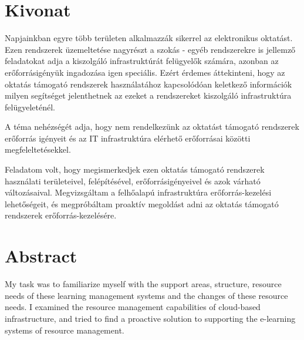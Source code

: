 \chapter*{Kivonat}

Napjainkban egyre több területen alkalmazzák sikerrel az elektronikus oktatást. Ezen rendszerek üzemeltetése nagyrészt a szokás - egyéb rendszerekre is jellemző feladatokat adja a kiszolgáló infrastruktúrát felügyelők számára, azonban az erőforrásigényük ingadozása igen speciális. Ezért érdemes áttekinteni, hogy az oktatás támogató rendszerek használatához kapcsolódóan keletkező információk milyen segítséget jelenthetnek az ezeket a rendszereket kiszolgáló infrastruktúra felügyeleténél.

A téma nehézségét adja, hogy nem rendelkezünk az oktatást támogató rendszerek erőforrás igényeit és az IT infrastruktúra elérhető erőforrásai közötti megfeleltetésekkel.

Feladatom volt, hogy megismerkedjek ezen oktatás támogató rendszerek használati területeivel, felépítésével, erőforrásigényeivel és azok várható változásaival. Megvizsgáltam a felhőalapú infrastruktúra erőforrás-kezelési lehetőségeit, és megpróbáltam proaktív megoldást adni az oktatás támogató rendszerek erőforrás-kezelésére.
\vfill

\chapter*{Abstract}

My task was to familiarize myself with the support areas, structure, resource needs of these learning management systems and the changes of these resource needs. I examined the resource management capabilities of cloud-based infrastructure, and tried to find a proactive solution to supporting the e-learning systems of resource management.

\vfill

